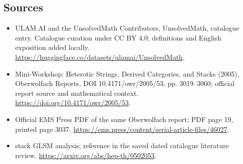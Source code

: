 \documentclass[11pt]{article}
\begin{document}
\subsection{Sources}
\begin{itemize}
\item[\hypertarget{source:statement:1}{S1}] ULAM.AI and the UnsolvedMath Contributors, UnsolvedMath, catalogue entry. Catalogue curation under CC BY 4.0; definitions and English exposition added locally.
\url{https://huggingface.co/datasets/ulamai/UnsolvedMath}.
\item[\hypertarget{source:statement:2}{S2}] Mini-Workshop: Heterotic Strings, Derived Categories, and Stacks (2005), Oberwolfach Reports, DOI 10.4171/owr/2005/53, pp. 3019--3060; official report source and mathematical context.
\url{https://doi.org/10.4171/owr/2005/53}.
\item[\hypertarget{source:statement:3}{S3}] Official EMS Press PDF of the same Oberwolfach report; PDF page 19, printed page 3037.
\url{https://ems.press/content/serial-article-files/46027}.
\item[\hypertarget{source:statement:4}{S4}] stack GLSM analysis; reference in the saved dated catalogue literature review.
\url{https://arxiv.org/abs/hep-th/0502053}.
\end{itemize}
\label{end:statement}
\end{document}
